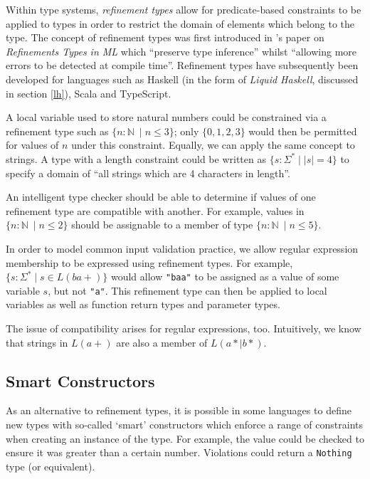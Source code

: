 \documentclass[a4paper,openany,12pt]{book}
\begin{document}
Within type systems, \emph{refinement types} allow for predicate-based constraints to be applied to types in order to
restrict the domain of elements which belong to the type.
The concept of refinement types was first introduced in \citet{freemanreftypes}'s paper on
\emph{Refinements Types in ML} which ``preserve type inference'' whilst ``allowing more errors to be detected at
compile time''.
Refinement types have subsequently been developed for languages such as Haskell (in the form of \emph{Liquid Haskell},
discussed in section \ref{lh}), Scala and TypeScript.

A local variable used to store natural numbers could be constrained via a refinement type such as
$\{n: \mathbb{N}\ \mid n \leq 3\}$; only $\{0, 1, 2, 3\}$ would then be permitted for values of $n$ under this
constraint.
Equally, we can apply the same concept to strings.
A type with a length constraint could be written as $\{s : \Sigma^* \mid \left| s \right| = 4 \}$ to specify a domain
of ``all strings which are 4 characters in length''.

An intelligent type checker should be able to determine if values of one refinement type are compatible with another.
For example, values in $\{n: \mathbb{N}\ \mid n \leq 2\}$ should be assignable to a member of type
$\{n: \mathbb{N}\ \mid n \leq 5\}$.

In order to model common input validation practice, we allow regular expression membership to be expressed using
refinement types.
For example, $\{s: \Sigma^* \mid s \in L(ba+)\}$ would allow \texttt{"baa"} to be assigned as a value of some variable
$s$, but not \texttt{"a"}.
This refinement type can then be applied to local variables as well as function return types and parameter types.

The issue of compatibility arises for regular expressions, too.
Intuitively, we know that strings in $L(a+)$ are also a member of $L(a*|b*)$.

\subsection{Smart Constructors}

As an alternative to refinement types, it is possible in some languages to define new types with so-called `smart'
constructors which enforce a range of constraints when creating an instance of the type.
For example, the value could be checked to ensure it was greater than a certain number.
Violations could return a \texttt{Nothing} type (or equivalent).
\end{document}
